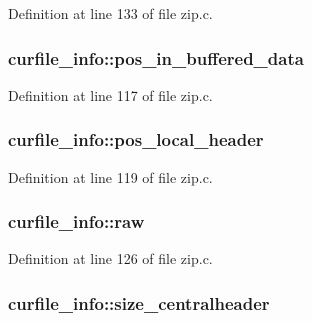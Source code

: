 Definition at line 133 of file zip.\-c.

\hypertarget{structcurfile__info_ab1e433122ecceb389c8d258830e89f6f}{
\subsubsection[{pos\-\_\-in\-\_\-buffered\-\_\-data}]{ curfile\-\_\-info\-::pos\-\_\-in\-\_\-buffered\-\_\-data}}\label{structcurfile__info_ab1e433122ecceb389c8d258830e89f6f}


Definition at line 117 of file zip.\-c.

\hypertarget{structcurfile__info_ae859aac5711395f5136a26a393f4f3ec}{
\subsubsection[{pos\-\_\-local\-\_\-header}]{ curfile\-\_\-info\-::pos\-\_\-local\-\_\-header}}\label{structcurfile__info_ae859aac5711395f5136a26a393f4f3ec}


Definition at line 119 of file zip.\-c.

\hypertarget{structcurfile__info_ab79a678fff8d4fb6e55f410d33a5d555}{
\subsubsection[{raw}]{ curfile\-\_\-info\-::raw}}\label{structcurfile__info_ab79a678fff8d4fb6e55f410d33a5d555}


Definition at line 126 of file zip.\-c.

\hypertarget{structcurfile__info_a25272deebbc7e9f5f474f4c2b36e27a6}{
\subsubsection[{size\-\_\-centralheader}]{ curfile\-\_\-info\-::size\-\_\-centralheader}}\label{structcurfile__info_a25272deebbc7e9f5f474f4c2b36e27a6}



